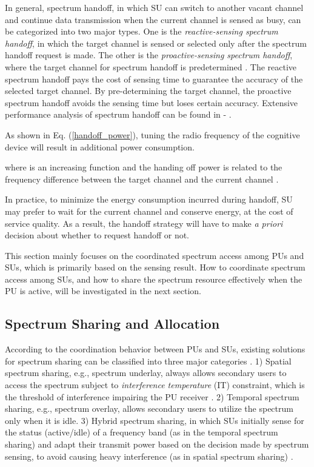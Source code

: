 \documentclass[journal,12pt,onecolumn]{IEEEtran}
\begin{document}
In general, spectrum handoff, in which SU can switch to another vacant channel and continue data transmission when the current channel is sensed as busy, can be categorized into two major types. One is the \emph{reactive-sensing spectrum handoff}, in which the target channel is sensed or selected only after the spectrum handoff request is made. The other is the \emph{proactive-sensing spectrum handoff}, where the target channel for spectrum handoff is predetermined \cite{proANDreHO}. The reactive spectrum handoff pays the cost of sensing time to guarantee the accuracy of the selected target channel. By pre-determining the target channel, the proactive spectrum handoff avoids the sensing time but loses certain accuracy. Extensive performance analysis of spectrum handoff can be found in \cite{proANDreHO} - \cite{5285171}. 

As shown in Eq. (\ref{handoff_power}), tuning the radio frequency of the cognitive device will result in additional power consumption. 

where  is an increasing function and the handing off power  is related to the frequency difference between the target channel  and the current channel .


In practice, to minimize the energy consumption incurred during handoff, SU may prefer to wait for the current channel and conserve energy, at the cost of service quality. As a result, the handoff strategy will have to make \emph{a priori} decision about whether to request handoff or not.





This section mainly focuses on the coordinated spectrum access among PUs and SUs, which is primarily based on the sensing result. How to coordinate spectrum access among SUs, and how to share the spectrum resource effectively when the PU is active, will be investigated in the next section.

\subsection{Spectrum Sharing and Allocation}
According to the coordination behavior between PUs and SUs, existing solutions for spectrum sharing can be classified into three major categories \cite{temANDspatialSSHARING}. 1) Spatial spectrum sharing, e.g., spectrum underlay, always allows secondary users to access the spectrum subject to \emph{interference temperature} (IT) constraint, which is the threshold of interference impairing the PU receiver \cite{interTempeSSharing}. 2) Temporal spectrum sharing, e.g., spectrum overlay, allows secondary users to utilize the spectrum only when it is idle. 3) Hybrid spectrum sharing, in which SUs initially sense for the status (active/idle) of a frequency band (as in the temporal spectrum sharing) and adapt their transmit power based on the decision made by spectrum sensing, to avoid causing heavy interference (as in spatial spectrum sharing) \cite{twoSharing}.
\end{document}
